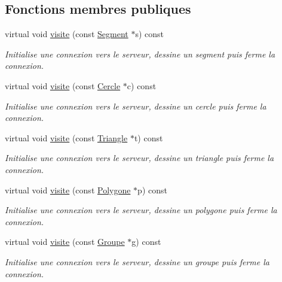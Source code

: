 \subsection*{Fonctions membres publiques}
\begin{DoxyCompactItemize}
\item 
virtual void \mbox{\hyperlink{class_visiteur_dessin_a39d12a331fcc80c183fc706cdb2d394a}{visite}} (const \mbox{\hyperlink{class_segment}{Segment}} $\ast$s) const
\begin{DoxyCompactList}\small\item\em Initialise une connexion vers le serveur, dessine un segment puis ferme la connexion. \end{DoxyCompactList}\item 
virtual void \mbox{\hyperlink{class_visiteur_dessin_ab757769d7c4bf7eac6263eecc8554896}{visite}} (const \mbox{\hyperlink{class_cercle}{Cercle}} $\ast$c) const
\begin{DoxyCompactList}\small\item\em Initialise une connexion vers le serveur, dessine un cercle puis ferme la connexion. \end{DoxyCompactList}\item 
virtual void \mbox{\hyperlink{class_visiteur_dessin_a8278a3991c52c9d00e5ad5a051faacfe}{visite}} (const \mbox{\hyperlink{class_triangle}{Triangle}} $\ast$t) const
\begin{DoxyCompactList}\small\item\em Initialise une connexion vers le serveur, dessine un triangle puis ferme la connexion. \end{DoxyCompactList}\item 
virtual void \mbox{\hyperlink{class_visiteur_dessin_a59ef1f9a400906300fa4e6d3c1ec0ea1}{visite}} (const \mbox{\hyperlink{class_polygone}{Polygone}} $\ast$p) const
\begin{DoxyCompactList}\small\item\em Initialise une connexion vers le serveur, dessine un polygone puis ferme la connexion. \end{DoxyCompactList}\item 
virtual void \mbox{\hyperlink{class_visiteur_dessin_a295e7bd446e4650257d0cb8c4d8c9ec5}{visite}} (const \mbox{\hyperlink{class_groupe}{Groupe}} $\ast$g) const
\begin{DoxyCompactList}\small\item\em Initialise une connexion vers le serveur, dessine un groupe puis ferme la connexion. \end{DoxyCompactList}\end{DoxyCompactItemize}



